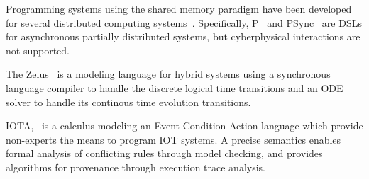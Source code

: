 
%
Programming systems using the  shared memory paradigm have been developed for several distributed computing systems~\cite{dsm1991,Adve96sharedmemory,Azure,Cassandra,Dynamo}.
Specifically, P~\cite{Planguage}  and PSync~\cite{PSyncLanguage} are DSLs for  asynchronous partially  distributed systems, but cyberphysical interactions are not supported.


%
The Zelus~\cite{zelus1} is a modeling language for hybrid systems using a synchronous language compiler to handle the discrete logical time transitions and an ODE solver to handle its continous time evolution transitions.

IOTA,~\cite{iota} is a calculus modeling an Event-Condition-Action language which provide non-experts the means to program IOT systems. A precise semantics enables formal analysis of conflicting rules through model checking, and provides algorithms for provenance through execution trace analysis.



